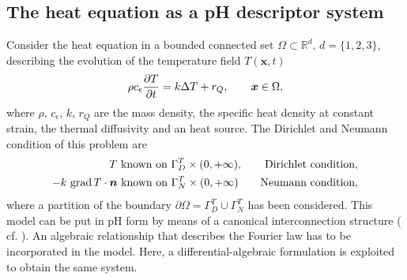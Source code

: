\subsection{The heat equation as a pH descriptor system}\label{sec:phheat}
Consider the heat equation in a bounded connected set $\Omega \subset \mathbb{R}^d, \, d=\{1,2,3\}$, describing the evolution of the temperature field $T(\bm{x}, t)$
\begin{equation}\label{eq:heatEq}
\rho c_\epsilon \diffp{T}{t} = k \Delta T + r_Q, \qquad \bm{x} \in \Omega,
\end{equation}
where $\rho,\, c_\epsilon,\, k,\, r_Q$ are the mass density, the specific heat density at constant strain, the thermal diffusivity and an heat source. The Dirichlet and Neumann condition of this problem are 
\begin{equation*}
	\begin{aligned}
	T \text{ known on } \Gamma_D^T \times (0, +\infty), \qquad \text{Dirichlet condition}, \\
	-k \, \operatorname*{grad} T \cdot \bm{n} \text{ known on } \Gamma_N^T \times (0, +\infty) \qquad \text{Neumann condition},
	\end{aligned}
\end{equation*}
where a partition of the boundary $\partial \Omega = \Gamma_D^T \cup \Gamma_N^T$ has been considered. This model can be put in pH form by means of a canonical interconnection structure ( cf. \cite[Chapter 2]{kotyczka2019numerical}). An algebraic relationship that describes the Fourier law has to be incorporated in the model. Here, a differential-algebraic formulation is exploited to obtain the same system. \\

